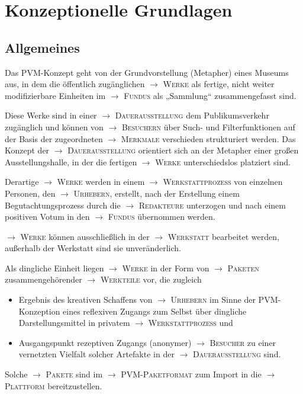 \documentclass[a4paper,11pt]{article}
\newcommand{\glossar}[1]{{$\to$ \textsc{#1}}}
\begin{document}
\section{Konzeptionelle Grundlagen}

\subsection{Allgemeines}\label{grundlagen.allgemeines}

Das PVM-Konzept geht von der Grundvorstellung (Metapher) eines Museums aus, in
dem die öffentlich zugänglichen \glossar{Werke} als fertige, nicht weiter
modifizierbare Einheiten im \glossar{Fundus} als „Sammlung“ zusammengefasst
sind.  

Diese Werke sind in einer \glossar{Dauerausstellung} dem Publikumsverkehr
zugänglich und können von \glossar{Besuchern} über Such- und Filterfunktionen
auf der Basis der zugeordneten \glossar{Merkmale} verschieden strukturiert
werden.  Das Konzept der \glossar{Dauerausstellung} orientiert sich an der
Metapher einer großen Ausstellungshalle, in der die fertigen \glossar{Werke}
unterschiedslos platziert sind.

Derartige \glossar{Werke} werden in einem \glossar{Werkstattprozess} von
einzelnen Personen, den \glossar{Urhebern}, erstellt, nach der Erstellung
einem Begutachtungsprozess durch die \glossar{Redakteure} unterzogen und nach
einem positiven Votum in den \glossar{Fundus} übernommen werden.

\glossar{Werke} können ausschließlich in der \glossar{Werkstatt} bearbeitet
werden, außerhalb der Werkstatt sind sie unveränderlich.

Als dingliche Einheit liegen \glossar{Werke} in der Form von \glossar{Paketen}
zusammengehörender \glossar{Werkteile} vor, die zugleich
\begin{itemize}
\item Ergebnis des kreativen Schaffens von \glossar{Urhebern} im Sinne der
  PVM-Konzeption eines reflexiven Zugangs zum Selbst über dingliche
  Darstellungsmittel in privatem \glossar{Werkstattprozess} und
\item Ausgangspunkt rezeptiven Zugangs (anonymer) \glossar{Besucher} zu einer
  vernetzten Vielfalt solcher Artefakte in der \glossar{Dauerausstellung}
  sind.
\end{itemize}
Solche \glossar{Pakete} sind im \glossar{PVM-Paketformat} zum Import in die
\glossar{Plattform} bereitzustellen.
\end{document}

